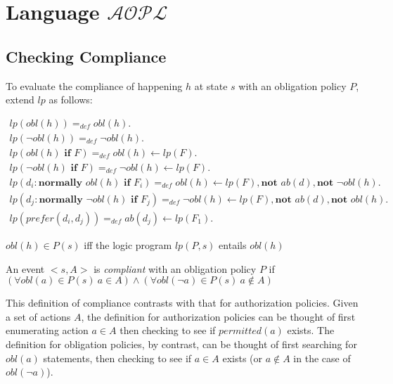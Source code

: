 \chapter{Language $\mathcal{AOPL}$}
\label{appendix:aopl}

\section{Checking Compliance}
\label{appendix:aopl_compliance}

To evaluate the compliance of happening $h$ at state $s$ with an obligation policy $P$, \citet{gelfond_authorization_2008} extend $lp$ as follows:

\begin{gather}
    lp(obl(h)) =_{def}
        obl(h). \\
    lp(\neg obl(h)) =_{def}
        \neg obl(h). \\
    lp(obl(h) \textbf{ if } F) =_{def}
        obl(h) \leftarrow
            lp(F). \\
    lp(\neg obl(h) \textbf{ if } F) =_{def}
        \neg obl(h) \leftarrow
            lp(F). \\
    lp(d_i: \textbf{normally } obl(h) \textbf{ if } F_i) =_{def}
        obl(h) \leftarrow
            lp(F),
            \textbf{not } ab(d),
            \textbf{not } \neg obl(h). \\
    lp(d_j: \textbf{normally } \neg obl(h) \textbf{ if } F_j) =_{def}
        \neg obl(h) \leftarrow
            lp(F),
            \textbf{not } ab(d),
            \textbf{not } obl(h). \\
    lp(prefer(d_i, d_j)) =_{def}
        ab(d_j) \leftarrow lp(F_1).
\end{gather}

\begin{definition}
    $obl(h) \in P(s)$ iff the logic program $lp(P, s)$ entails $obl(h)$
\end{definition}

\begin{definition}
    \label{def:obligation_event_compliance}
    An event $<s, A>$ is \textit{compliant} with an obligation policy $P$ if $(\forall obl(a) \in P(s) \ a \in A) \land (\forall obl(\neg a) \in P(s) \ a \not \in A)$
\end{definition}

This definition of compliance contrasts with that for authorization policies.
Given a set of actions $A$, the definition for authorization policies can be thought of first enumerating action $a \in A$ then checking to see if $permitted(a)$ exists.
The definition for obligation policies, by contrast, can be thought of first searching for $obl(a)$ statements, then checking to see if $a \in A$ exists (or $a \not \in A$ in the case of $obl(\neg a)$).

